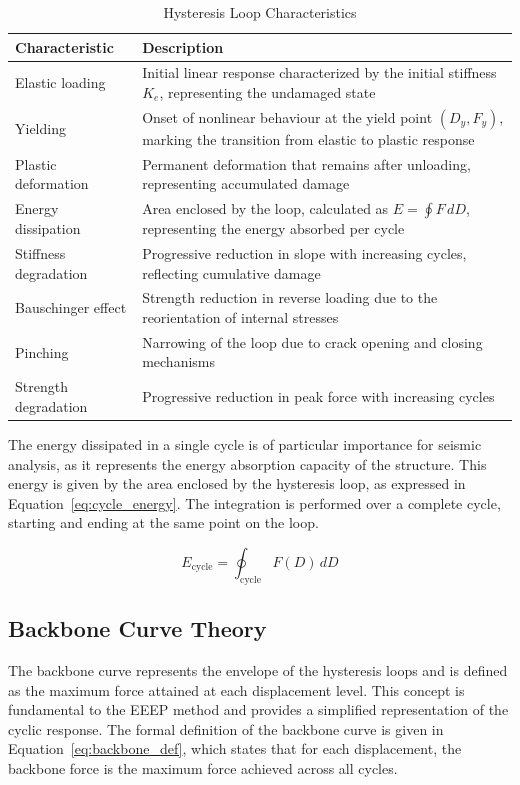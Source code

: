\documentclass[11pt,a4paper]{article}
\begin{document}
\begin{table}[h]
\centering
\caption{Hysteresis Loop Characteristics}\label{tab:hysteresis_chars}
\begin{tabular}{p{4cm}p{10cm}}
\toprule
\textbf{Characteristic} & \textbf{Description} \\
\midrule
Elastic loading & Initial linear response characterized by the initial stiffness \(K_e\), representing the undamaged state \\
Yielding & Onset of nonlinear behaviour at the yield point \((D_y, F_y)\), marking the transition from elastic to plastic response \\
Plastic deformation & Permanent deformation that remains after unloading, representing accumulated damage \\
Energy dissipation & Area enclosed by the loop, calculated as \(E = \oint F \, dD\), representing the energy absorbed per cycle \\
Stiffness degradation & Progressive reduction in slope with increasing cycles, reflecting cumulative damage \\
Bauschinger effect & Strength reduction in reverse loading due to the reorientation of internal stresses \\
Pinching & Narrowing of the loop due to crack opening and closing mechanisms \\
Strength degradation & Progressive reduction in peak force with increasing cycles \\
\bottomrule
\end{tabular}
\end{table}

The energy dissipated in a single cycle is of particular importance for seismic analysis, as it represents the energy absorption capacity of the structure. This energy is given by the area enclosed by the hysteresis loop, as expressed in Equation~\ref{eq:cycle_energy}. The integration is performed over a complete cycle, starting and ending at the same point on the loop.

\begin{equation}
E_{\text{cycle}} = \oint_{\text{cycle}} F(D) \, dD
\label{eq:cycle_energy}
\end{equation}

\subsection{Backbone Curve Theory}

The backbone curve represents the envelope of the hysteresis loops and is defined as the maximum force attained at each displacement level. This concept is fundamental to the EEEP method and provides a simplified representation of the cyclic response. The formal definition of the backbone curve is given in Equation~\ref{eq:backbone_def}, which states that for each displacement, the backbone force is the maximum force achieved across all cycles.
\end{document}
